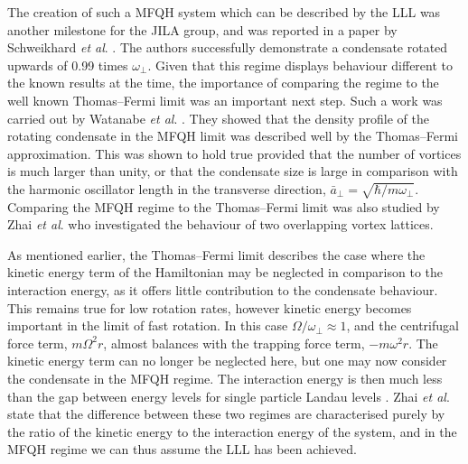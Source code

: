 The creation of such a MFQH system which can be described by the LLL was another milestone for the JILA group, and was reported in a paper by Schweikhard \textit{et al}. \cite{Vtx:Schweikhard_prl_2004}. The authors successfully demonstrate a condensate rotated upwards of 0.99 times $\omega_{\perp}$. Given that this regime displays behaviour different to the known results at the time, the importance of comparing the regime to the well known Thomas--Fermi limit was an important next step. Such a work was carried out by Watanabe \textit{et al}. \cite{Vtx:Watanabe_prl_2004}. They showed that the density profile of the rotating condensate in the MFQH limit was described well by the Thomas--Fermi approximation. This was shown to hold true provided that the number of vortices is much larger than unity, or that the condensate size is large in comparison with the harmonic oscillator length in the transverse direction, $\bar{a}_{\perp} = \sqrt{\hbar/m\omega_{\perp}}$. Comparing the MFQH regime to the Thomas--Fermi limit was also studied by Zhai \textit{et al}. \cite{Vtx:Zhai_pra_2004} who investigated the behaviour of two overlapping vortex lattices.

As mentioned earlier, the Thomas--Fermi limit describes the case where the kinetic energy term of the Hamiltonian may be neglected in comparison to the interaction energy, as it offers little contribution to the condensate behaviour. This remains true for low rotation rates, however kinetic energy becomes important in the limit of fast rotation. In this case $\Omega/\omega_{\perp}\approx 1$, and the centrifugal force term, $m\Omega^2r$, almost balances with the trapping force term, $-m\omega^2r$. The kinetic energy term can no longer be neglected here, but one may now consider the condensate in the MFQH regime. The interaction energy is then much less than the gap between energy levels for single particle Landau levels \cite{Vtx:Ho_prl_2001}. Zhai \textit{et al}. state that the difference between these two regimes are characterised purely by the ratio of the kinetic energy to the interaction energy of the system, and in the MFQH regime we can thus assume the LLL has been achieved.

